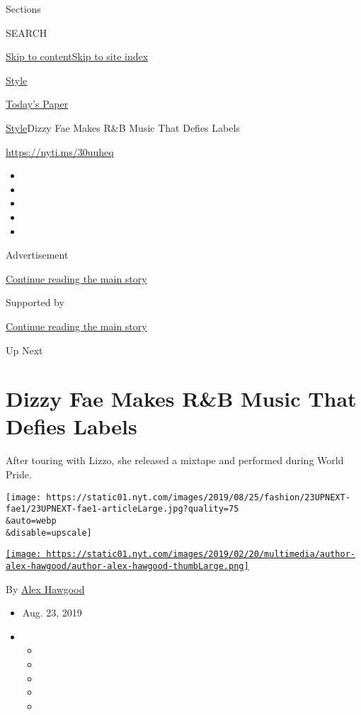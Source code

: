 Sections

SEARCH

\protect\hyperlink{site-content}{Skip to
content}\protect\hyperlink{site-index}{Skip to site index}

\href{https://www.nytimes.com/section/style}{Style}

\href{https://myaccount.nytimes.com/auth/login?response_type=cookie\&client_id=vi}{}

\href{https://www.nytimes.com/section/todayspaper}{Today's Paper}

\href{/section/style}{Style}\textbar{}Dizzy Fae Makes R\&B Music That
Defies Labels

\href{https://nyti.ms/30uuheq}{https://nyti.ms/30uuheq}

\begin{itemize}
\item
\item
\item
\item
\item
\end{itemize}

Advertisement

\protect\hyperlink{after-top}{Continue reading the main story}

Supported by

\protect\hyperlink{after-sponsor}{Continue reading the main story}

Up Next

\hypertarget{dizzy-fae-makes-rb-music-that-defies-labels}{%
\section{Dizzy Fae Makes R\&B Music That Defies
Labels}\label{dizzy-fae-makes-rb-music-that-defies-labels}}

After touring with Lizzo, she released a mixtape and performed during
World Pride.

\texttt{[image: https://static01.nyt.com/images/2019/08/25/fashion/23UPNEXT-fae1/23UPNEXT-fae1-articleLarge.jpg?quality=75\\\&auto=webp\\\&disable=upscale]}

\href{https://www.nytimes.com/by/alex-hawgood}{\texttt{[image: https://static01.nyt.com/images/2019/02/20/multimedia/author-alex-hawgood/author-alex-hawgood-thumbLarge.png]}}

By \href{https://www.nytimes.com/by/alex-hawgood}{Alex Hawgood}

\begin{itemize}
\item
  Aug. 23, 2019
\item
  \begin{itemize}
  \item
  \item
  \item
  \item
  \item
  \end{itemize}
\end{itemize}

